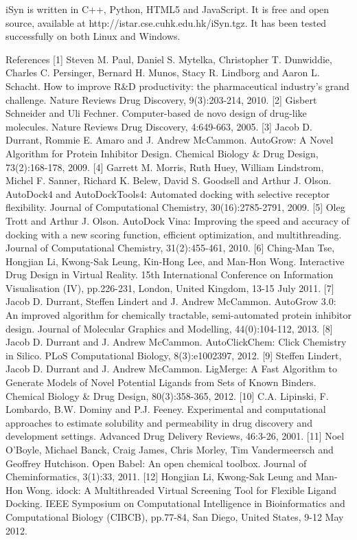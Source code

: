 iSyn is written in C++, Python, HTML5 and JavaScript. It is free and open source, available at http://istar.cse.cuhk.edu.hk/iSyn.tgz. It has been tested successfully on both Linux and Windows.


References
[1] 	Steven M. Paul, Daniel S. Mytelka, Christopher T. Dunwiddie, Charles C. Persinger, Bernard H. Munos, Stacy R. Lindborg and Aaron L. Schacht. How to improve R&D productivity: the pharmaceutical industry's grand challenge. Nature Reviews Drug Discovery, 9(3):203-214, 2010.
[2] 	Gisbert Schneider and Uli Fechner. Computer-based de novo design of drug-like molecules. Nature Reviews Drug Discovery, 4:649-663, 2005.
[3] 	Jacob D. Durrant, Rommie E. Amaro and J. Andrew McCammon. AutoGrow: A Novel Algorithm for Protein Inhibitor Design. Chemical Biology & Drug Design, 73(2):168-178, 2009.
[4] 	Garrett M. Morris, Ruth Huey, William Lindstrom, Michel F. Sanner, Richard K. Belew, David S. Goodsell and Arthur J. Olson. AutoDock4 and AutoDockTools4: Automated docking with selective receptor flexibility. Journal of Computational Chemistry, 30(16):2785-2791, 2009.
[5] 	Oleg Trott and Arthur J. Olson. AutoDock Vina: Improving the speed and accuracy of docking with a new scoring function, efficient optimization, and multithreading. Journal of Computational Chemistry, 31(2):455-461, 2010.
[6] 	Ching-Man Tse, Hongjian Li, Kwong-Sak Leung, Kin-Hong Lee, and Man-Hon Wong. Interactive Drug Design in Virtual Reality. 15th International Conference on Information Visualisation (IV), pp.226-231, London, United Kingdom, 13-15 July 2011.
[7] 	Jacob D. Durrant, Steffen Lindert and J. Andrew McCammon. AutoGrow 3.0: An improved algorithm for chemically tractable, semi-automated protein inhibitor design. Journal of Molecular Graphics and Modelling, 44(0):104-112, 2013.
[8] 	Jacob D. Durrant and J. Andrew McCammon. AutoClickChem: Click Chemistry in Silico. PLoS Computational Biology, 8(3):e1002397, 2012.
[9] 	Steffen Lindert, Jacob D. Durrant and J. Andrew McCammon. LigMerge: A Fast Algorithm to Generate Models of Novel Potential Ligands from Sets of Known Binders. Chemical Biology & Drug Design, 80(3):358-365, 2012.
[10] 	C.A. Lipinski, F. Lombardo, B.W. Dominy and P.J. Feeney. Experimental and computational approaches to estimate solubility and permeability in drug discovery and development settings. Advanced Drug Delivery Reviews, 46:3-26, 2001.
[11] 	Noel O'Boyle, Michael Banck, Craig James, Chris Morley, Tim Vandermeersch and Geoffrey Hutchison. Open Babel: An open chemical toolbox. Journal of Cheminformatics, 3(1):33, 2011.
[12] 	Hongjian Li, Kwong-Sak Leung and Man-Hon Wong. idock: A Multithreaded Virtual Screening Tool for Flexible Ligand Docking. IEEE Symposium on Computational Intelligence in Bioinformatics and Computational Biology (CIBCB), pp.77-84, San Diego, United States, 9-12 May 2012.
